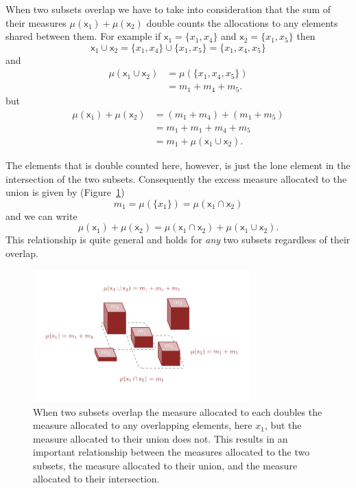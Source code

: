 \documentclass[
  letterpaper,
  DIV=11,
  numbers=noendperiod]{scrartcl}
\begin{document}
When two subsets overlap we have to take into consideration that the sum
of their measures \(\mu ( \mathsf{x}_{1} ) + \mu ( \mathsf{x}_{2} )\)
double counts the allocations to any elements shared between them. For
example if \(\mathsf{x}_{1} = \{ x_{1}, x_{4} \}\) and
\(\mathsf{x}_{2} = \{ x_{1}, x_{5} \}\) then \[
\mathsf{x}_{1} \cup \mathsf{x}_{2}
=
\{ x_{1}, x_{4} \} \cup \{ x_{1}, x_{5} \}
=
\{ x_{1}, x_{4}, x_{5} \}
\] and \begin{align*}
\mu( \mathsf{x}_{1} \cup \mathsf{x}_{2} )
&=
\mu( \{ x_{1}, x_{4}, x_{5} \} )
\\
&=
m_{1} + m_{4} + m_{5}.
\end{align*} but \begin{align*}
\mu( \mathsf{x}_{1} ) + \mu ( \mathsf{x}_{2} )
&=
(m_{1} + m_{4} ) + ( m_{1} + m_{5} )
\\
&=
m_{1} + m_{1} + m_{4} + m_{5}
\\
&=
m_{1} + \mu( \mathsf{x}_{1} \cup \mathsf{x}_{2} ).
\end{align*}

The elements that is double counted here, however, is just the lone
element in the intersection of the two subsets. Consequently the excess
measure allocated to the union is given by
(Figure~\ref{fig-overlapping_subsets_measures}) \[
m_{1} = \mu( \{ x_{1} \} ) = \mu( \mathsf{x}_{1} \cap \mathsf{x}_{2} )
\] and we can write \[
\mu( \mathsf{x}_{1} ) + \mu ( \mathsf{x}_{2} )
=
  \mu( \mathsf{x}_{1} \cap \mathsf{x}_{2} )
+ \mu( \mathsf{x}_{1} \cup \mathsf{x}_{2} ).
\] This relationship is quite general and holds for \emph{any} two
subsets regardless of their overlap.

\begin{figure}

{\centering \includegraphics[width=0.75\textwidth,height=\textheight]{figures/overlapping_subsets_measures/overlapping_subsets_measures.pdf}

}

\caption{\label{fig-overlapping_subsets_measures}When two subsets
overlap the measure allocated to each doubles the measure allocated to
any overlapping elements, here \(x_{1}\), but the measure allocated to
their union does not. This results in an important relationship between
the measures allocated to the two subsets, the measure allocated to
their union, and the measure allocated to their intersection.}

\end{figure}
\end{document}
